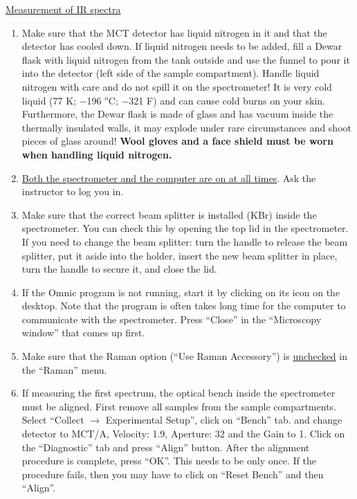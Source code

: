 \documentclass[byrevtex,amssymb,aps,pra,floatfix,letterpaper]{revtex4}
\begin{document}
\noindent
\underline{Measurement of IR spectra}\\

\begin{enumerate}
\item Make sure that the MCT detector has liquid nitrogen in it and that the detector has cooled down. If liquid nitrogen needs to be added, fill a Dewar flask with liquid nitrogen from the tank outside and use the funnel to pour it into the detector (left side of the sample compartment). Handle liquid nitrogen with care and do not spill it on the spectrometer! It is very cold liquid (77 K; $-$196 $^o$C; $-$321 F) and can cause cold burns on your skin. Furthermore, the Dewar flask is made of glass and has vacuum inside the thermally insulated walls, it may explode under rare circumstances and shoot pieces of glass around! \textbf{Wool gloves and a face shield must be worn when handling liquid nitrogen.}

\item \underline{Both the spectrometer and the computer are on at all times}. Ask the instructor to log you in.

\item Make sure that the correct beam splitter is installed (KBr) inside the spectrometer. You can check this by opening the top lid in the spectrometer. If you need to change the beam splitter: turn the handle to release the beam splitter, put it aside into the holder, insert the new beam splitter in place, turn the handle to secure it, and close the lid.

\item If the Omnic program is not running, start it by clicking on its icon on the desktop. Note that the program is often takes long time for the computer to communicate with the spectrometer. Press ``Close'' in the ``Microscopy window'' that comes up first.

\item Make sure that the Raman option (``Use Raman Accessory'') is \underline{unchecked} in the ``Raman'' menu.

\item If measuring the first spectrum, the optical bench inside the spectrometer must be aligned. First remove all samples from the sample compartments. Select ``Collect $\to$ Experimental Setup'', click on ``Bench'' tab. and change detector to MCT/A, Velocity: 1.9, Aperture: 32 and the Gain to 1. Click on the ``Diagnostic'' tab and press ``Align'' button. After the alignment procedure is complete, press ``OK''. This needs to be only once. If the procedure fails, then you may have to click on ``Reset Bench'' and then ``Align''.


\end{enumerate}
\end{document}
